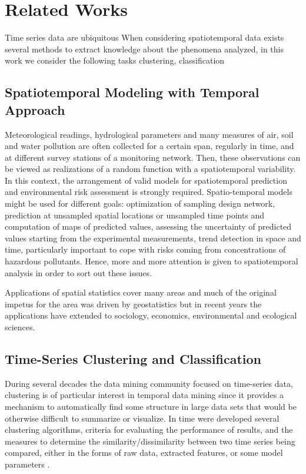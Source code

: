 \chapter{Related Works}
\label{chapter_Related_Works}

Time series data are ubiquitous  
When considering spatiotemporal data exists several methods to extract knowledge about the phenomena analyzed, in this work we consider the following tasks clustering, classification

\section{Spatiotemporal Modeling with Temporal Approach}
\label{Sec:SPT-Temporal}
Meteorological readings, hydrological parameters and many measures of air, soil and water pollution are often collected for a certain span, regularly in time, and at different survey stations of a monitoring network. Then, these observations can be viewed as realizations of a random function with a spatiotemporal variability. In this context, the arrangement of valid models for spatiotemporal prediction and environmental risk assessment is strongly required. Spatio-temporal models might be used for different goals: optimization of sampling design network, prediction at unsampled spatial locations or unsampled time points and computation of maps of predicted values, assessing the uncertainty of predicted values starting from the experimental measurements, trend detection in space and time, particularly important to cope with risks coming from concentrations of hazardous pollutants. Hence, more and more attention is given to spatiotemporal analysis in order to sort out these issues.

Applications of spatial statistics cover many areas and much of the original impetus for the area was driven by geostatistics but in recent years the applications have extended to sociology, economics, environmental and ecological sciences.




\section{Time-Series Clustering and Classification}
\label{Sec:ClusteringRelatedWorks}

During several decades the data mining community focused on time-series data, clustering is of particular interest in temporal data mining since it provides a mechanism to automatically find some structure in large data sets that would be otherwise difficult to summarize or visualize. In time were developed several clustering algorithms, criteria for evaluating the performance of results, and the measures to determine the similarity/dissimilarity between two time series being compared, either in the forms of raw data, extracted features, or some model parameters \cite{Liao2005, Aghabozorgi2015}.

